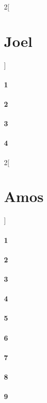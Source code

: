 \documentclass{book}
\begin{document}
\begin{multicols}{2}[\part{Joel}]
\subsection*{1}
\subsection*{2}
\subsection*{3}
\subsection*{4}
\end{multicols}
\begin{multicols}{2}[\part{Amos}]
\subsection*{1}
\subsection*{2}
\subsection*{3}
\subsection*{4}
\subsection*{5}
\subsection*{6}
\subsection*{7}
\subsection*{8}
\subsection*{9}
\end{multicols}
\end{document}
